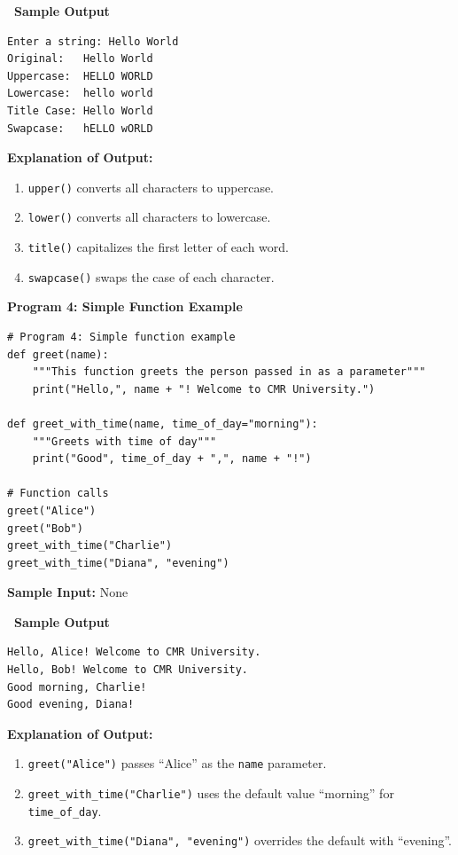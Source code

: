\documentclass[12pt,a4paper]{article}
\newcommand{\outhead}{\noindent\colorbox{cmrgreen!25}%
  {\textbf{\small\color{cmrdark}~Sample Output~}}\par\vspace{-1pt}}
\begin{document}
\outhead
\begin{lstlisting}[style=outputstyle]
Enter a string: Hello World
Original:   Hello World
Uppercase:  HELLO WORLD
Lowercase:  hello world
Title Case: Hello World
Swapcase:   hELLO wORLD
\end{lstlisting}

\textbf{Explanation of Output:}
\begin{enumerate}
  \item \texttt{upper()} converts all characters to uppercase.
  \item \texttt{lower()} converts all characters to lowercase.
  \item \texttt{title()} capitalizes the first letter of each word.
  \item \texttt{swapcase()} swaps the case of each character.
\end{enumerate}

\vspace{0.5cm}

\textbf{Program 4: Simple Function Example}

\begin{lstlisting}
# Program 4: Simple function example
def greet(name):
    """This function greets the person passed in as a parameter"""
    print("Hello,", name + "! Welcome to CMR University.")

def greet_with_time(name, time_of_day="morning"):
    """Greets with time of day"""
    print("Good", time_of_day + ",", name + "!")

# Function calls
greet("Alice")
greet("Bob")
greet_with_time("Charlie")
greet_with_time("Diana", "evening")
\end{lstlisting}

\textbf{Sample Input:} None

\outhead
\begin{lstlisting}[style=outputstyle]
Hello, Alice! Welcome to CMR University.
Hello, Bob! Welcome to CMR University.
Good morning, Charlie!
Good evening, Diana!
\end{lstlisting}

\textbf{Explanation of Output:}
\begin{enumerate}
  \item \texttt{greet("Alice")} passes ``Alice'' as the \texttt{name} parameter.
  \item \texttt{greet\_with\_time("Charlie")} uses the default value ``morning'' for \texttt{time\_of\_day}.
  \item \texttt{greet\_with\_time("Diana", "evening")} overrides the default with ``evening''.
\end{enumerate}
\end{document}

